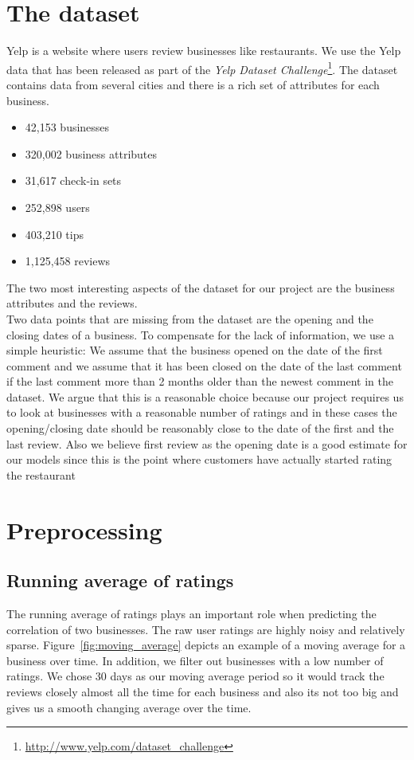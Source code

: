 \documentclass{vldb}
\begin{document}
\section{The dataset}

Yelp is a website where users review businesses like restaurants.
We use the Yelp data that has been released as part of the \textit{Yelp Dataset Challenge}\footnote{\url{http://www.yelp.com/dataset\_challenge}}.
The dataset contains data from several cities and there is a rich set of attributes for each business.

\begin{itemize}
  \item 42,153 businesses
  \item 320,002 business attributes
  \item 31,617 check-in sets
  \item 252,898 users
  \item 403,210 tips
  \item 1,125,458 reviews
\end{itemize}

The two most interesting aspects of the dataset for our project are the business attributes and the reviews.\\
Two data points that are missing from the dataset are the opening and the closing dates of a business.
To compensate for the lack of information, we use a simple heuristic: We assume that the business opened on the date of the first comment and we assume that it has been closed on the date of the last comment if the last comment more than 2 months older than the newest comment in the dataset.
We argue that this is a reasonable choice because our project requires us to look at businesses with a reasonable number of ratings and in these cases the opening/closing date should be reasonably close to the date of the first and the last review. Also we believe first review as the opening date is a good estimate for our models since this is the point where customers have actually started rating the restaurant

\section{Preprocessing}
\subsection{Running average of ratings}
The running average of ratings plays an important role when predicting the correlation of two businesses.
The raw user ratings are highly noisy and relatively sparse.
Figure~\ref{fig:moving_average} depicts an example of a moving average for a business over time.
In addition, we filter out businesses with a low number of ratings. We chose 30 days as our moving average period so it would track the reviews closely almost all the time for each business and also its not too big and gives us a smooth changing average over the time.
\end{document}
